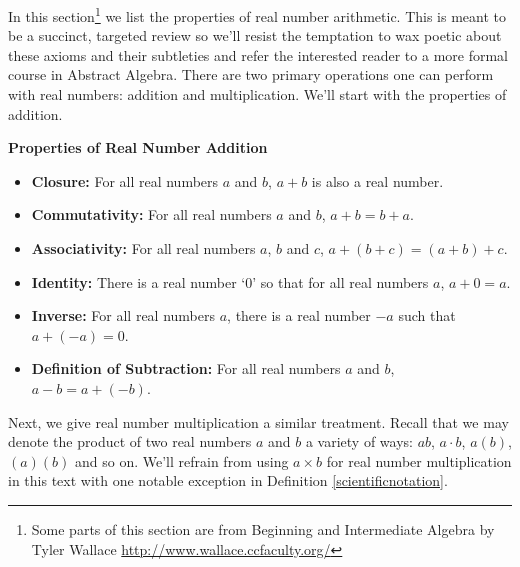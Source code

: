 

\setcounter{footnote}{0}

\label{AppRealNumberArithmetic}


In this section\footnote{Some parts of this section are from {\sc Beginning and Intermediate Algebra} by Tyler Wallace \url{http://www.wallace.ccfaculty.org/}} we list the properties of real number arithmetic.  This is meant to be a succinct, targeted review so we'll resist the temptation to wax poetic about these axioms and their subtleties and refer the interested reader to a more formal course in Abstract Algebra.  There are two primary operations one can perform with real numbers:  addition and multiplication.  We'll start with the properties of addition.

\medskip

\label{realnumberaddition}

\colorbox{ResultColor}{\bbm

\centerline{\textbf{Properties of Real Number Addition}}

\begin{itemize}

\item  \textbf{Closure:}  For all real numbers $a$ and $b$,  $a+b$ is also a real number.

\item  \textbf{Commutativity:}  For all real numbers $a$ and $b$, $a+b = b+a$.

\item  \textbf{Associativity:}  For all real numbers $a$, $b$ and $c$, $a+(b+c) = (a+b)+c$.

\item  \textbf{Identity:}  There is a real number `$0$' so that for all real numbers $a$, $a+0 = a$.

\item  \textbf{Inverse:}  For all real numbers $a$, there is a real number $-a$ such that $a + (-a) = 0$.

\item \textbf{Definition of Subtraction:}  For all real numbers $a$ and $b$, $a - b = a + (-b)$.

\end{itemize}

\ebm}

\medskip

Next, we give real number multiplication a similar treatment.  Recall that we may denote the product of two real numbers $a$ and $b$ a variety of ways:  $ab$, $a \cdot b$, $a(b)$, $(a)(b)$ and so on.  We'll refrain from using $a \times b$ for real number multiplication in this text with one notable exception in Definition \ref{scientificnotation}.


